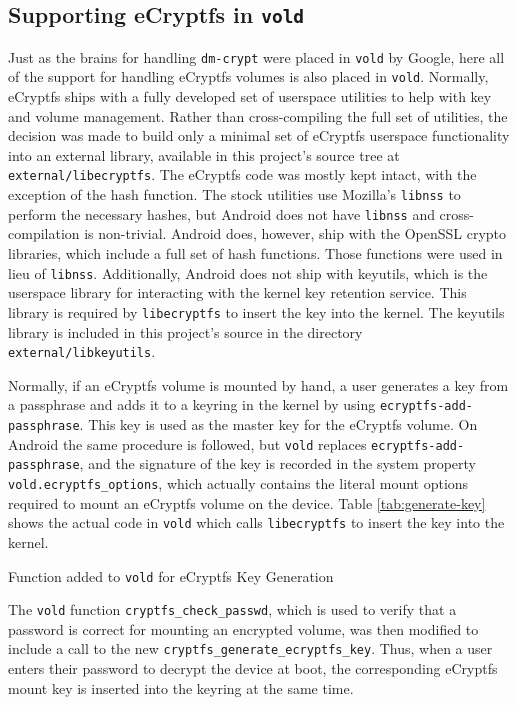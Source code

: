 \subsection{Supporting eCryptfs in \texttt{vold}} \label{sec:ecryptfsvold} Just as the brains for handling \texttt{dm-crypt} were
placed in \texttt{vold} by Google, here all of the support for handling eCryptfs volumes is also placed in \texttt{vold}. Normally,
eCryptfs ships with a fully developed set of userspace utilities to help with key and volume management. Rather than cross-compiling
the full set of utilities, the decision was made to build only a minimal set of eCryptfs userspace functionality into an external
library, available in this project's source tree at \texttt{external/libecryptfs}.  The eCryptfs code was mostly kept intact, with
the exception of the hash function. The stock utilities use Mozilla's \texttt{libnss} to perform the necessary hashes, but Android
does not have \texttt{libnss} and cross-compilation is non-trivial. Android does, however, ship with the OpenSSL crypto libraries,
which include a full set of hash functions. Those functions were used in lieu of \texttt{libnss}.  Additionally, Android does not
ship with keyutils, which is the userspace library for interacting with the kernel key retention service.  This library is required
by \texttt{libecryptfs} to insert the key into the kernel. The keyutils library is included in this project's source in the
directory \texttt{external/libkeyutils}. 

Normally, if an eCryptfs volume is mounted by hand, a user generates a key from a passphrase and adds it to a keyring in the kernel
by using \texttt{ecryptfs-add-passphrase}.  This key is used as the master key for the eCryptfs volume. On Android the same
procedure is followed, but \texttt{vold} replaces \texttt{ecryptfs-add-passphrase}, and the signature of the key is recorded in the
system property \texttt{vold.ecryptfs\_options}, which actually contains the literal mount options required to mount an eCryptfs
volume on the device. Table \ref{tab:generate-key} shows the actual code in \texttt{vold} which calls \texttt{libecryptfs} to insert
the key into the kernel. 


\begin{table}  \label{tab:generate-key}
\caption{Function added to \texttt{vold} for eCryptfs Key Generation}
\end{table}

The \texttt{vold} function \texttt{cryptfs\_check\_passwd}, which is used to verify that a password is correct for mounting an
encrypted volume, was then modified to include a call to the new \texttt{cryptfs\_generate\_ecryptfs\_key}. Thus, when a user enters
their password to decrypt the device at boot, the corresponding eCryptfs mount key is inserted into the keyring at the same time.

